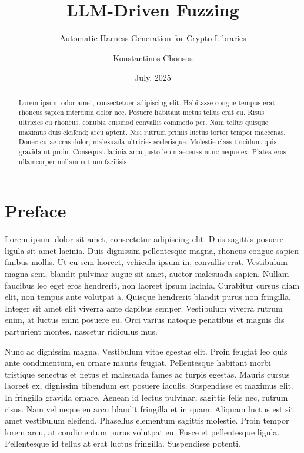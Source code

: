 \documentclass[
  a4paper,
  DIV=11,
  numbers=noendperiod]{scrreprt}
\title{LLM-Driven Fuzzing}
\subtitle{Automatic Harness Generation for Crypto Libraries}
\author{Konstantinos Chousos}
\date{July, 2025}
\begin{document}
\maketitle
\begin{abstract}
Lorem ipsum odor amet, consectetuer adipiscing elit. Habitasse congue
tempus erat rhoncus sapien interdum dolor nec. Posuere habitant metus
tellus erat eu. Risus ultricies eu rhoncus, conubia euismod convallis
commodo per. Nam tellus quisque maximus duis eleifend; arcu aptent. Nisi
rutrum primis luctus tortor tempor maecenas. Donec curae cras dolor;
malesuada ultricies scelerisque. Molestie class tincidunt quis gravida
ut proin. Consequat lacinia arcu justo leo maecenas nunc neque ex.
Platea eros ullamcorper nullam rutrum facilisis.
\end{abstract}



\chapter*{Preface}\label{preface}


Lorem ipsum dolor sit amet, consectetur adipiscing elit. Duis sagittis
posuere ligula sit amet lacinia. Duis dignissim pellentesque magna,
rhoncus congue sapien finibus mollis. Ut eu sem laoreet, vehicula ipsum
in, convallis erat. Vestibulum magna sem, blandit pulvinar augue sit
amet, auctor malesuada sapien. Nullam faucibus leo eget eros hendrerit,
non laoreet ipsum lacinia. Curabitur cursus diam elit, non tempus ante
volutpat a. Quisque hendrerit blandit purus non fringilla. Integer sit
amet elit viverra ante dapibus semper. Vestibulum viverra rutrum enim,
at luctus enim posuere eu. Orci varius natoque penatibus et magnis dis
parturient montes, nascetur ridiculus mus.

Nunc ac dignissim magna. Vestibulum vitae egestas elit. Proin feugiat
leo quis ante condimentum, eu ornare mauris feugiat. Pellentesque
habitant morbi tristique senectus et netus et malesuada fames ac turpis
egestas. Mauris cursus laoreet ex, dignissim bibendum est posuere
iaculis. Suspendisse et maximus elit. In fringilla gravida ornare.
Aenean id lectus pulvinar, sagittis felis nec, rutrum risus. Nam vel
neque eu arcu blandit fringilla et in quam. Aliquam luctus est sit amet
vestibulum eleifend. Phasellus elementum sagittis molestie. Proin tempor
lorem arcu, at condimentum purus volutpat eu. Fusce et pellentesque
ligula. Pellentesque id tellus at erat luctus fringilla. Suspendisse
potenti.
\end{document}

